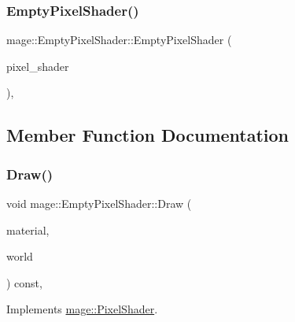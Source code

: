 \subsubsection{\texorpdfstring{Empty\+Pixel\+Shader()}{EmptyPixelShader()}\hspace{0.1cm}{\footnotesize\ttfamily [3/3]}}
{\footnotesize\ttfamily mage\+::\+Empty\+Pixel\+Shader\+::\+Empty\+Pixel\+Shader (\begin{DoxyParamCaption}\item[{\hyperlink{classmage_1_1_empty_pixel_shader}{Empty\+Pixel\+Shader} \&\&}]{pixel\+\_\+shader }\end{DoxyParamCaption})\hspace{0.3cm}{\ttfamily [private]}, {\ttfamily [delete]}}



\subsection{Member Function Documentation}
\hypertarget{classmage_1_1_empty_pixel_shader_ababff79ea9746a94b838bb2f8dfd1fbf}{}\label{classmage_1_1_empty_pixel_shader_ababff79ea9746a94b838bb2f8dfd1fbf} 
\subsubsection{\texorpdfstring{Draw()}{Draw()}}
{\footnotesize\ttfamily void mage\+::\+Empty\+Pixel\+Shader\+::\+Draw (\begin{DoxyParamCaption}\item[{const \hyperlink{structmage_1_1_material}{Material} \&}]{material,  }\item[{const \hyperlink{classmage_1_1_world}{World} \&}]{world }\end{DoxyParamCaption}) const\hspace{0.3cm}{\ttfamily [override]}, {\ttfamily [virtual]}}



Implements \hyperlink{classmage_1_1_pixel_shader_ac7662093a83213881698dca25f8215a2}{mage\+::\+Pixel\+Shader}.

\hypertarget{classmage_1_1_empty_pixel_shader_a7702fdae1d752ed422d1508e6ee08479}{}\label{classmage_1_1_empty_pixel_shader_a7702fdae1d752ed422d1508e6ee08479} 
